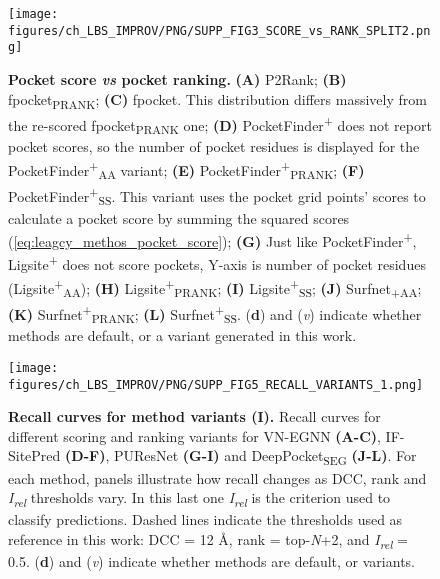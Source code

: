 \begin{figure}[htb!]
    \centering
    \texttt{[image: figures/ch\_LBS\_IMPROV/PNG/SUPP\_FIG3\_SCORE\_vs\_RANK\_SPLIT2.png]}
    \caption[Pocket score \textit{vs} pocket ranking]{\textbf{Pocket score \textit{vs} pocket ranking.} \textbf{(A)} P2Rank; \textbf{(B)} fpocket\textsubscript{PRANK}; \textbf{(C)} fpocket. This distribution differs massively from the re-scored fpocket\textsubscript{PRANK} one; \textbf{(D)} PocketFinder\textsuperscript{+} does not report pocket scores, so the number of pocket residues is displayed for the PocketFinder\textsuperscript{+}\textsubscript{AA} variant; \textbf{(E)} PocketFinder\textsuperscript{+}\textsubscript{PRANK}; \textbf{(F)} PocketFinder\textsuperscript{+}\textsubscript{SS}. This variant uses the pocket grid points’ scores to calculate a pocket score by summing the squared scores (\autoref{eq:leagcy_methos_pocket_score}); \textbf{(G)} Just like PocketFinder\textsuperscript{+}, Ligsite\textsuperscript{+} does not score pockets, Y-axis is number of pocket residues (Ligsite\textsuperscript{+}\textsubscript{AA}); \textbf{(H)} Ligsite\textsuperscript{+}\textsubscript{PRANK}; \textbf{(I)} Ligsite\textsuperscript{+}\textsubscript{SS}; \textbf{(J)} Surfnet\textsubscript{+}\textsubscript{AA}; \textbf{(K)} Surfnet\textsuperscript{+}\textsubscript{PRANK}; \textbf{(L)} Surfnet\textsuperscript{+}\textsubscript{SS}. (\textbf{d}) and (\textit{v}) indicate whether methods are default, or a variant generated in this work.}
    \label{fig:pocket_score_vs_rank2}
\end{figure}

\begin{figure}[ht!]
    \centering
    \texttt{[image: figures/ch\_LBS\_IMPROV/PNG/SUPP\_FIG5\_RECALL\_VARIANTS\_1.png]}
    \caption[Recall curves for method variants (I)]{\textbf{Recall curves for method variants (I).} Recall curves for different scoring and ranking variants for VN-EGNN \textbf{(A-C)}, IF-SitePred \textbf{(D-F)}, PUResNet \textbf{(G-I)} and DeepPocket\textsubscript{SEG} \textbf{(J-L)}. For each method, panels illustrate how recall changes as DCC, rank and \textit{I\textsubscript{rel}} thresholds vary. In this last one \textit{I\textsubscript{rel}} is the criterion used to classify predictions. Dashed lines indicate the thresholds used as reference in this work: DCC = 12 \AA{}, rank = top-\textit{N}+2, and \textit{I\textsubscript{rel}} = 0.5. (\textbf{d}) and (\textit{v}) indicate whether methods are default, or variants.}
    \label{fig:pocker_recall_variants1}
\end{figure}

